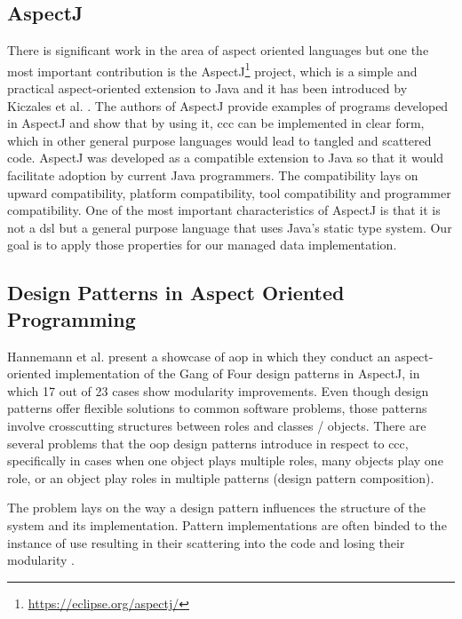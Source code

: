\subsection{AspectJ}\label{AspectJ}
There is significant work in the area of aspect oriented languages but one the most important contribution is the AspectJ\footnote{\url{https://eclipse.org/aspectj/}} project, which is a simple and practical aspect-oriented extension to Java and it has been introduced by Kiczales et al. \cite{kiczales2001overview}.
The authors of AspectJ provide examples of programs developed in AspectJ and show that by using it, \ac{ccc} can be implemented in clear form, which in other general purpose languages would lead to tangled and scattered code. 
AspectJ was developed as a compatible extension to Java so that it would facilitate adoption by current Java programmers. 
The compatibility lays on upward compatibility, platform compatibility, tool compatibility and programmer compatibility. One of the most important characteristics of AspectJ is that it is not a \ac{dsl} but a general purpose language that uses Java's static type system.
Our goal is to apply those properties for our managed data implementation.

\subsection{Design Patterns in Aspect Oriented Programming}\label{Design Patterns in Aspect Oriented Programming}

Hannemann et al. present a showcase of \ac{aop} \cite{hannemann2002design} in which they conduct an aspect-oriented implementation of the Gang of Four design patterns \cite{gamma1995design} in AspectJ, in which 17 out of 23 cases show modularity improvements.
Even though design patterns offer flexible solutions to common software problems, those patterns involve crosscutting structures between roles and classes / objects. 
There are several problems that the \ac{oop} design patterns introduce in respect to \ac{ccc}, specifically in cases when one object plays multiple roles, many objects play one role, or an object play roles in multiple patterns \cite{sullivan2002advanced} (design pattern composition).

The problem lays on the way a design pattern influences the structure of the system and its implementation. 
Pattern implementations are often binded to the instance of use resulting in their scattering into the code and losing their modularity \cite{hannemann2002design}.


